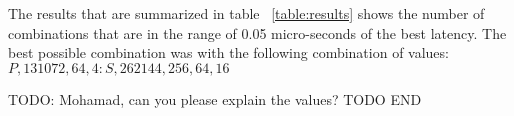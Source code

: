 The results that are summarized in table ~\ref{table:results} shows the number
of combinations that are in the range of 0.05 micro-seconds of the best
latency. The best possible combination was with the following combination of values:
$P,131072,64,4:S,262144,256,64,16$

TODO: Mohamad, can you please explain the values? TODO END



